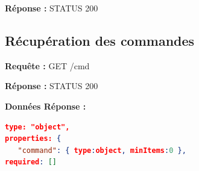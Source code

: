 \documentclass[12pt,a4paper]{report}
\begin{document}
\textbf{Réponse :} STATUS 200

\subsection{Récupération des commandes}

\textbf{Requête :} GET /cmd


\textbf{Réponse :} STATUS 200

\textbf{Données Réponse :} 

\begin{lstlisting}[language=JSON]
type: "object",
properties: {
   "command": { type:object, minItems:0 },
required: []

\end{lstlisting}
\end{document}
